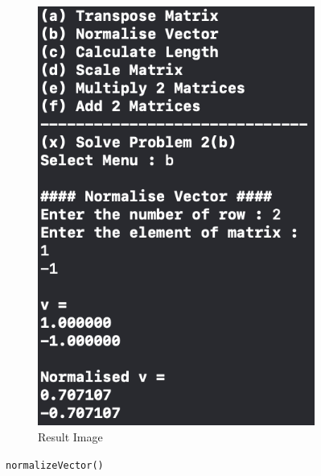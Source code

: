 \begin{figure}[h]
\begin{subfigure}[b]{0.45\textwidth}
        \includegraphics[width=\textwidth]{img/prj0/b.png}
        \caption{Result Image}
        \label{fig:image}
    \end{subfigure}
    \caption{\texttt{normalizeVector()}}
\end{figure}
\pagebreak


